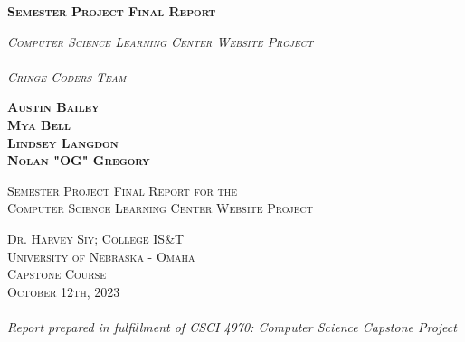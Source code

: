 \documentclass[oneside,openany,obeyspaces]{book}
\newcommand\TeamName{Cringe Coders Team}
\begin{document}
\begin{titlepage}
    \begin{center}
        \vspace*{0.25cm}
        \begin{huge}
            \textsc{\textbf{Semester Project Final Report}}
        \end{huge}

        \vspace{0.5cm}

        \begin{Large}
            \textsc{\textit{Computer Science Learning Center Website Project}}\\~\\
            \textsc{\textit{\TeamName}}
        \end{Large}

        \vspace{1.5cm}

        \textsc{
            \textbf{Austin Bailey}\\
            \textbf{Mya Bell}\\
            \textbf{Lindsey Langdon}\\
            \textbf{Nolan "OG" Gregory}
        }

        \vfill

        \textsc{Semester Project Final Report for the\\
            Computer Science Learning Center Website Project\\}

        \vspace{0.8cm}

        \textsc{Dr. Harvey Siy; College IS\&T\\
            University of Nebraska - Omaha\\
            Capstone Course\\
            October 12th, 2023}\\~\\

        \textit{Report prepared in fulfillment of CSCI 4970: Computer Science Capstone Project}
    \end{center}
\end{titlepage}

\tableofcontents
\end{document}
